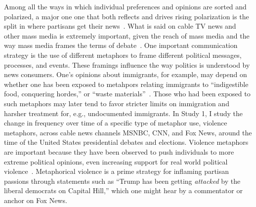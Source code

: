 \documentclass[12pt,letterpaper]{article}
\begin{document}
Among all the ways in which individual preferences and opinions are sorted and polarized, a
major one one that both reflects and drives rising polarization is the split in
where partisans get their news~\cite{Pew2014PolarizationAndMediaHabits,Martin2017}. 
What is said on cable TV news and other mass media is extremely important, given
the reach of mass media and the way mass media frames the terms of debate~\cite{Chong2007}.
One important communication strategy is the use of different 
metaphors to frame different political
messages, processes, and events. These framings influence the way politics is understood by 
news consumers. One's opinions about immigrants, for example, may depend
on whether one has been exposed to metahpors relating immigrants to 
``indigestible food, conquering hordes,'' or ``waste materials''~\cite{OBrien2003}.
Those who had been exposed to such metaphors may later tend to favor stricter limits
on immigration and harsher treatment for, e.g., undocumented immigrants.
In Study 1, I study the change in frequency over time of a 
specific type of metaphor use, violence metaphors, across cable news channels
MSNBC, CNN, and Fox News, around the time of the United States presidential
debates and elections. Violence metaphors are important because they have
been observed to push individuals to more extreme political opinions, even
increasing support for real world political violence~\cite{Kalmoe2014,Kalmoe2018}.
Metaphorical violence is a prime strategy for inflaming partisan passions 
through statements such as ``Trump has been getting \emph{attacked} by the liberal
democrats on Capital Hill,'' which one might hear by a commentator or anchor on Fox News.
\end{document}
